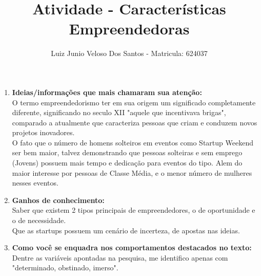 \documentclass[a4paper,11pt]{article}
\title{\vspace{-4cm}Atividade - Características Empreendedoras}
\author{Luiz Junio Veloso Dos Santos - Matricula: 624037}
\begin{document}
 

\maketitle

\begin{enumerate}
    \item \textbf{Ideias/informações que mais chamaram sua atenção:}
        \\
        O termo empreendedorismo ter em sua origem um significado completamente diferente,
        significando no seculo XII "aquele que incentivava brigas", comparado a atualmente
        que caracteriza pessoas que criam e conduzem novos projetos inovadores.
        \\
        O fato que o número de homens solteiros em eventos como Startup Weekend ser bem
        maior, talvez demonstrando que pessoas solteiras e sem emprego (Jovens) possuem mais tempo e 
        dedicação para eventos do tipo. Alem do maior interesse por pessoas de Classe Média, e
        o menor número de mulheres nesses eventos.
    \item \textbf{Ganhos de conhecimento:}
        \\
        Saber que existem 2 tipos principais de empreendedores, o de oportunidade e o de necessidade.
        \\
        Que as startups possuem um cenário de incerteza, de apostas nas ideias.
    \item \textbf{Como você se enquadra nos comportamentos destacados no texto:}
        \\
        Dentre as variáveis apontadas na pesquisa, me identifico apenas com "determinado, obstinado,
        imerso".
\end{enumerate}
\end{document}
